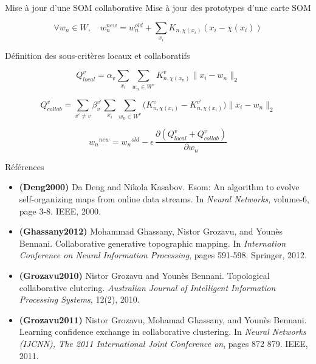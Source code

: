 \documentclass[hyperref={pdfpagelabels=false}]{beamer}
\begin{document}
    \begin{frame}{Mise à jour d'une SOM collaborative}
        Mise à jour des prototypes d'une carte SOM

        \begin{equation*}
            \forall w_n \in W, \quad w_n^{new} = w_n^{old} + \sum_{x_i} 
            K_{n,\chi(x_i)} \left( x_i - \chi(x_i) \right)
        \end{equation*}

        Définition des sous-critères locaux et collaboratifs

        \begin{equation*}
            Q_{local}^v = \alpha_v \sum_{x_i} \sum_{w_n \in W^v} 
            K_{n,\chi(x_n)}^v\|x_i - w_n \|_2
        \end{equation*}

        \begin{equation*}
            Q_{collab}^v = \sum_{v' \neq v}\beta_v^{v'} \sum_{x_i}\sum_{w_n \in 
            W^v} \big(K^v_{n,\chi(x_i)} - K^{v'}_{n,\chi(x_i)}\big)\|x_i - w_n 
        \|_2 \end{equation*}

        \begin{equation*}
            {w_n}^{new} = {w_n}^{old} - \epsilon \, \frac{\partial \left(  
            Q^v_{local} + Q^v_{collab} \right) }{\partial w_n}
        \end{equation*}
    \end{frame}

    \begin{frame}{Références}
        \begin{itemize}
            \item \textbf{(Deng2000)} Da Deng and Nikola Kasabov. Esom: An algorithm to
                evolve self-organizing maps from online data streams. In
                \textit{Neural Networks}, volume-6, page 3-8. IEEE, 2000.
            \item \textbf{(Ghassany2012)} Mohammad Ghassany, Nistor Grozavu, and Younès
                Bennani. Collaborative generative topographic mapping. In
                \textit{Internation Conference on Neural Information
                Processing}, pages 591-598. Springer, 2012.
            \item \textbf{(Grozavu2010)} Nistor Grozavu and Younès Bennani. Topological
                collaborative clutering. \textit{Australian Journal of
                Intelligent Information Processing Systems}, 12(2), 2010.
            \item \textbf{(Grozavu2011)} Nistor Grozavu, Mohamad Ghassany, and Younès
                Bennani. Learning confidence exchange in collaborative
                clustering. In \textit{Neural Networks (IJCNN), The 2011
                International Joint Conference on}, pages 872 879. IEEE, 2011.
        \end{itemize}
    \end{frame}
\end{document}
